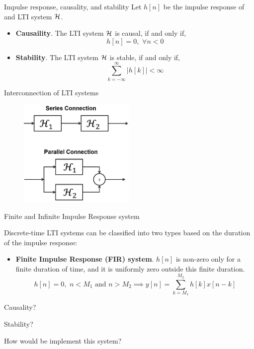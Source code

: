 \documentclass[aspectratio=169]{beamer}
\let\olditem\item
\renewcommand{\item}{\setlength{\itemsep}{\fill}\olditem}
\def\mc{\ensuremath\mathcal}
\begin{document}
\begin{frame}[t]{Impulse response, causality, and stability}
Let $h[n]$ be the impulse response of and LTI system $\mc{H}$. \vspace{0.5cm}

\begin{itemize}
  \item \textbf{Causaility}. The LTI system $\mc{H}$ is causal, if and only if,
  \[ h[n] = 0, \,\, \forall n < 0 \]
  \item \textbf{Stability}. The LTI system $\mc{H}$ is stable, if and only if,
  \[ \sum_{k=-\infty}^{\infty} \vert h[k] \vert < \infty \]
\end{itemize}
\end{frame}



\begin{frame}[t]{Interconnection of LTI systems}

\begin{figure}
\includegraphics[width=0.5\textwidth]{img/connections.png}
\end{figure}

\end{frame}

\begin{frame}[t]{Finite and Infinite Impulse Response system}

Discrete-time LTI systems can be classified into two types based on the duration of the impulse response:
\begin{itemize}
  \item \textbf{Finite Impulse Response (FIR) system}. $h[n]$ is non-zero only for a finite duration of time, and it is uniformly zero outside this finite duration.
  \[ h[n] = 0, \,\, n < M_1 \,\, \text{and} \,\, n > M_2 \implies y[n] = \sum_{k=M_1}^{M_2} h[k]x[n-k] \]
\end{itemize}

Causality? \vspace{0.5cm}

Stability?


How would be implement this system?

\end{frame}
\end{document}
